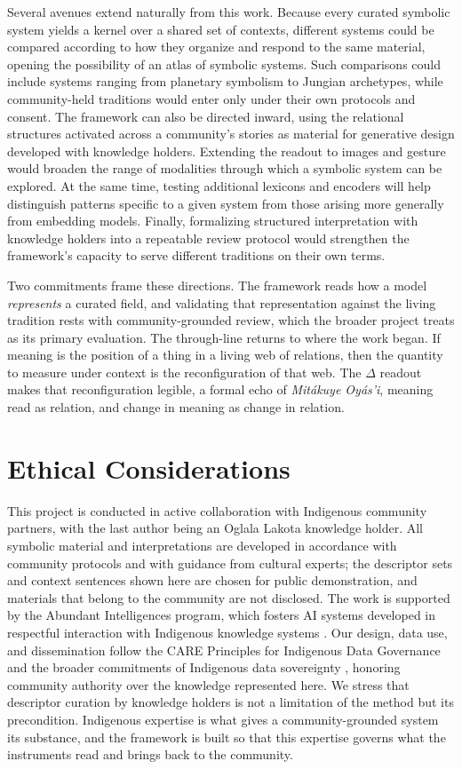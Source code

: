 \documentclass[final,creativeai]{article}
\begin{document}
Several avenues extend naturally from this work. Because every curated symbolic system yields a kernel over a shared set of contexts, different systems could be compared according to how they organize and respond to the same material, opening the possibility of an atlas of symbolic systems. Such comparisons could include systems ranging from planetary symbolism to Jungian archetypes, while community-held traditions would enter only under their own protocols and consent. The framework can also be directed inward, using the relational structures activated across a community’s stories as material for generative design developed with knowledge holders. Extending the readout to images and gesture would broaden the range of modalities through which a symbolic system can be explored. At the same time, testing additional lexicons and encoders will help distinguish patterns specific to a given system from those arising more generally from embedding models. Finally, formalizing structured interpretation with knowledge holders into a repeatable review protocol would strengthen the framework’s capacity to serve different traditions on their own terms.

Two commitments frame these directions. The framework reads how a model \emph{represents} a curated field, and validating that representation against the living tradition rests with community-grounded review, which the broader project treats as its primary evaluation. The through-line returns to where the work began. If meaning is the position of a thing in a living web of relations, then the quantity to measure under context is the reconfiguration of that web. The $\Delta$ readout makes that reconfiguration legible, a formal echo of \emph{Mitákuye Oyás'i}, meaning read as relation, and change in meaning as change in relation.

\section{Ethical Considerations}
This project is conducted in active collaboration with Indigenous community partners, with the last author being an Oglala Lakota knowledge holder. All symbolic material and interpretations are developed in accordance with community protocols and with guidance from cultural experts; the descriptor sets and context sentences shown here are chosen for public demonstration, and materials that belong to the community are not disclosed. The work is supported by the Abundant Intelligences program, which fosters AI systems developed in respectful interaction with Indigenous knowledge systems \citep{lewis_indigenous_2020}. Our design, data use, and dissemination follow the CARE Principles for Indigenous Data Governance \citep{carroll_care_2020} and the broader commitments of Indigenous data sovereignty \citep{kukutai_indigenous_2016}, honoring community authority over the knowledge represented here. We stress that descriptor curation by knowledge holders is not a limitation of the method but its precondition. Indigenous expertise is what gives a community-grounded system its substance, and the framework is built so that this expertise governs what the instruments read and brings back to the community.



\end{document}
